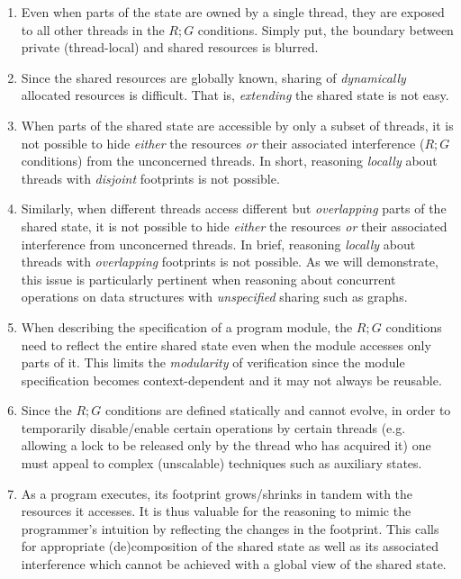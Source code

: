 \begin{enumerate}%
	\item Even when parts of the state are owned by a single thread, they are exposed to all other threads in the $R;G$ conditions. Simply put, the boundary between private (thread-local) and shared resources is blurred.
	
	\item Since the shared resources are globally known, sharing of \emph{dynamically} allocated resources is difficult. That is, \emph{extending} the shared state is not easy.
	
	\item When parts of the shared state are accessible by only a subset of threads, it is not possible to hide \emph{either} the resources \emph{or} their associated interference ($R;G$ conditions) from the unconcerned threads. In short, reasoning \emph{locally} about threads with \emph{disjoint} footprints is not possible.
	
	\item Similarly, when different threads access different but \emph{overlapping} parts of the shared state, it is not possible to hide \emph{either} the resources \emph{or} their associated interference from unconcerned threads. In brief, reasoning \emph{locally} about threads with \emph{overlapping} footprints is not possible. As we will demonstrate, this issue is particularly pertinent when reasoning about concurrent operations on data structures with \emph{unspecified} sharing such as graphs. 
	
	\item When describing the specification of a program module, the $R;G$ conditions need to reflect the entire shared state even when the module accesses only parts of it. This limits the \emph{modularity} of verification since the module specification becomes context-dependent and it may not always be reusable.
	
	\item Since the $R;G$ conditions are defined statically and cannot evolve, in order to temporarily disable/enable certain operations by certain threads (e.g. allowing a lock to be released only by the thread who has acquired it) one must appeal to complex (unscalable) techniques such as auxiliary states. 
	
	\item As a program executes, its footprint grows/shrinks in tandem with the resources it accesses. It is thus valuable for the reasoning to mimic the programmer's intuition by reflecting the changes in the footprint. This calls for appropriate (de)composition of the shared state as well as its associated interference which cannot be achieved with a global view of the shared state. \vspace{-5pt}
\end{enumerate}
